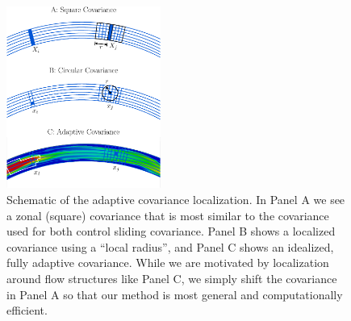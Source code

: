 
\begin{figure}[t]
  \centering
  \includegraphics[width=0.45\textwidth]{figures/covariance-localization-schematic-labeled-004.pdf}
  \caption[]{
    Schematic of the adaptive covariance localization.
    In Panel A we see a zonal (square) covariance that is most similar to the covariance used for both control sliding covariance.
    Panel B shows a localized covariance using a ``local radius'', and Panel C shows an idealized, fully adaptive covariance.
    While we are motivated by localization around flow structures like Panel C, we simply shift the covariance in Panel A so that our method is most general and computationally efficient.
  }
  \label{fig:covariance-localization-schematic}
\end{figure}

